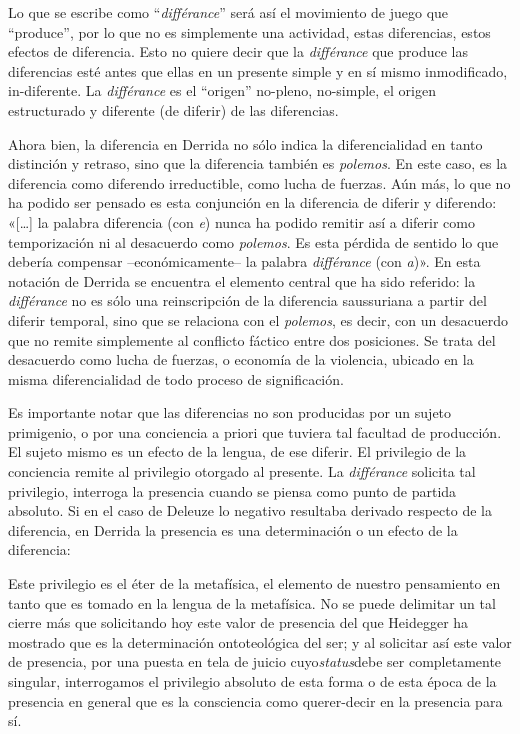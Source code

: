 Lo que se escribe como ``\emph{différance}'' será así el movimiento de juego que ``produce'', por lo que no es simplemente una actividad, estas diferencias, estos efectos de diferencia. Esto no quiere decir que la \emph{différance} que produce las diferencias esté antes que ellas en un presente simple y en sí mismo inmodificado, in-diferente. La \emph{différance} es el ``origen'' no-pleno, no-simple, el origen estructurado y diferente (de diferir) de las diferencias.

Ahora bien, la diferencia en Derrida no sólo indica la diferencialidad en tanto distinción y retraso, sino que la diferencia también es \emph{polemos}. En este caso, es la diferencia como diferendo irreductible, como lucha de fuerzas. Aún más, lo que no ha podido ser pensado es esta conjunción en la diferencia de diferir y diferendo: «{[}\ldots{]} la palabra diferencia (con \emph{e}) nunca ha podido remitir así a diferir como temporización ni al desacuerdo como \emph{polemos}. Es esta pérdida de sentido lo que debería compensar --económicamente-- la palabra \emph{différance} (con \emph{a})». En esta notación de Derrida se encuentra el elemento central que ha sido referido: la \emph{différance} no es sólo una reinscripción de la diferencia saussuriana a partir del diferir temporal, sino que se relaciona con el \emph{polemos}, es decir, con un desacuerdo que no remite simplemente al conflicto fáctico entre dos posiciones. Se trata del desacuerdo como lucha de fuerzas, o economía de la violencia, ubicado en la misma diferencialidad de todo proceso de significación.

Es importante notar que las diferencias no son producidas por un sujeto primigenio, o por una conciencia a priori que tuviera tal facultad de producción. El sujeto mismo es un efecto de la lengua, de ese diferir. El privilegio de la conciencia remite al privilegio otorgado al presente. La \emph{différance} solicita tal privilegio, interroga la presencia cuando se piensa como punto de partida absoluto. Si en el caso de Deleuze lo negativo resultaba derivado respecto de la diferencia, en Derrida la presencia es una determinación o un efecto de la diferencia:

Este privilegio es el éter de la metafísica, el elemento de nuestro pensamiento en tanto que es tomado en la lengua de la metafísica. No se puede delimitar un tal cierre más que solicitando hoy este valor de presencia del que Heidegger ha mostrado que es la determinación ontoteológica del ser; y al solicitar así este valor de presencia, por una puesta en tela de juicio cuyo\emph{status}debe ser completamente singular, interrogamos el privilegio absoluto de esta forma o de esta época de la presencia en general que es la consciencia como querer-decir en la presencia para sí.

